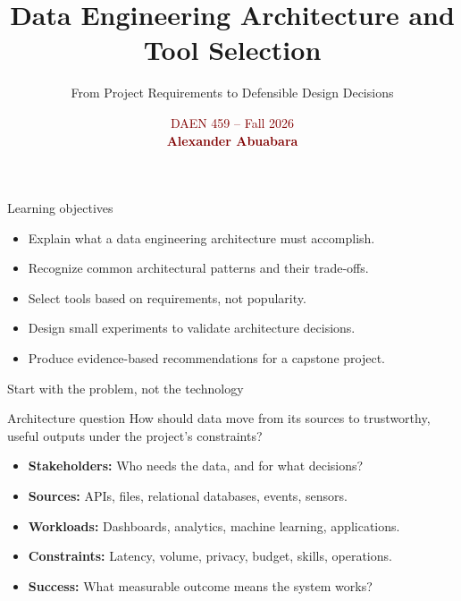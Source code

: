 \documentclass[aspectratio=43,10pt]{beamer}
\title{Data Engineering Architecture and Tool Selection}
\subtitle{From Project Requirements to Defensible Design Decisions}
\author{}
\date{\textcolor{maroon}{DAEN 459 -- Fall 2026\\
      \textbf{Alexander Abuabara}}}
\begin{document}
\begin{frame}
  \titlepage
\end{frame}

\begin{frame}{Learning objectives}
\begin{itemize}
  \item Explain what a data engineering architecture must accomplish.
  \item Recognize common architectural patterns and their trade-offs.
  \item Select tools based on requirements, not popularity.
  \item Design small experiments to validate architecture decisions.
  \item Produce evidence-based recommendations for a capstone project.
\end{itemize}
\end{frame}

\begin{frame}{Start with the problem, not the technology}
\begin{block}{Architecture question}
How should data move from its sources to trustworthy, useful outputs under the project's constraints?
\end{block}
\begin{itemize}
  \item \textbf{Stakeholders:} Who needs the data, and for what decisions?
  \item \textbf{Sources:} APIs, files, relational databases, events, sensors.
  \item \textbf{Workloads:} Dashboards, analytics, machine learning, applications.
  \item \textbf{Constraints:} Latency, volume, privacy, budget, skills, operations.
  \item \textbf{Success:} What measurable outcome means the system works?
\end{itemize}
\end{frame}
\end{document}
